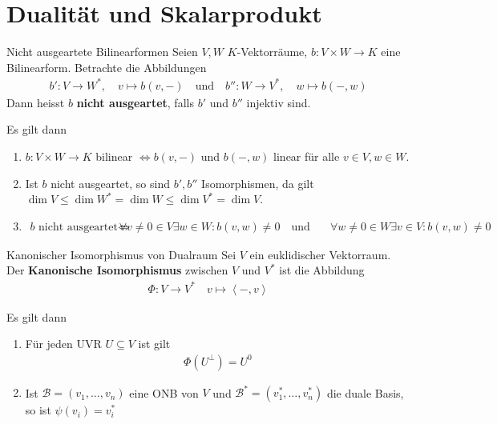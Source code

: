 \section{Dualität und Skalarprodukt}

\begin{definition}{Nicht ausgeartete Bilinearformen}
    Seien $V,W$ $K$-Vektorräume, $b: V \times W \to K$ eine Bilinearform. Betrachte die Abbildungen
    \begin{align*}
        b': V \to W^*, \quad v \mapsto b(v,-) \quad \text{und} \quad b'': W \to V^*, \quad w \mapsto b(-,w)
    \end{align*}
    Dann heisst $b$ \textbf{nicht ausgeartet}, falls $b'$ und $b''$ injektiv sind.
\end{definition}
Es gilt dann 
\begin{enumerate}
    \item	$b: V \times W \to K$ bilinear $\Leftrightarrow b(v,-)$ und $b(-,w)$ linear für alle $v \in V, w \in W$.
    \item   Ist $b$ nicht ausgeartet, so sind $b', b''$ Isomorphismen, da gilt $\dim V \leq \dim W^* = \dim W \leq \dim V^* = \dim V$. 
    \item   
    \begin{align*}
        b \text{ nicht ausgeartet } \Leftrightarrow &\forall v \neq 0 \in V \exists w \in W: b(v,w) \neq 0 \quad \text{und} \quad
        &\forall w \neq 0 \in W \exists v \in V: b(v,w) \neq 0    
    \end{align*}
\end{enumerate}


\begin{definition}{Kanonischer Isomorphismus von Dualraum}
    Sei $V$ ein euklidischer Vektorraum. Der \textbf{Kanonische Isomorphismus} zwischen $V$ und $V^*$ ist die Abbildung
    \begin{align*}
        \Phi: V \to V^* \quad v \mapsto \left<-,v\right>
    \end{align*}
\end{definition}
Es gilt dann
\begin{enumerate}
    \item	Für jeden UVR $U \subseteq V$ ist gilt
    \begin{align*}
        \Phi(U^{\bot}) = U^{0}
    \end{align*}
    \item   Ist $\mathcal{B} = (v_{1}, \ldots, v_{n})$ eine ONB von $V$ und $\mathcal{B}^* = (v_{1}^*, \ldots, v_{n}^*)$ die duale Basis, so ist $\psi(v_i) = v_i^*$
\end{enumerate}

